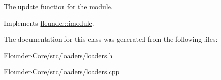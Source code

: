 The update function for the module. 



Implements \hyperlink{classflounder_1_1imodule_a9a53d48a46b5f6b16a92b2cd8503f74a}{flounder\+::imodule}.



The documentation for this class was generated from the following files\+:\begin{DoxyCompactItemize}
\item 
Flounder-\/\+Core/src/loaders/loaders.\+h\item 
Flounder-\/\+Core/src/loaders/loaders.\+cpp\end{DoxyCompactItemize}
